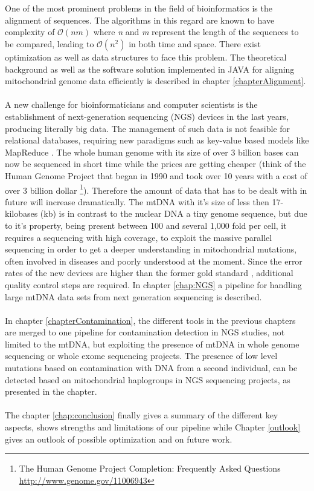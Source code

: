 \\
\\
One of the most prominent problems in the field of bioinformatics is the alignment of sequences. The algorithms in this regard are known to have complexity of $\mathcal O(nm)$ where \textit{n} and \textit{m} represent the length of the sequences to be compared, leading to $\mathcal O(n^2)$ in both time and space. There exist optimization as well as data structures to face this problem. The theoretical background as well as the software solution implemented in JAVA for aligning mitochondrial genome data efficiently is described in chapter \ref{chapterAlignment}.
\\
\\
A new challenge for bioinformaticians and computer scientists is the establishment of next-generation sequencing (NGS) devices in the last years, producing literally big data. The management of such data is not feasible for relational databases, requiring new paradigms such as key-value based models like MapReduce \cite{Dean2008}. The whole human genome with its size of over 3 billion bases can now be sequenced in short time while the prices are getting cheaper (think of the Human Genome Project that began in 1990 and took over 10 years with a cost of over 3 billion dollar \footnote{The Human Genome Project Completion: Frequently Asked Questions \url{http://www.genome.gov/11006943}}). Therefore the amount of data that has to be dealt with in future will increase dramatically. The mtDNA with it's size of less then 17-kilobases (kb) is in contrast to the nuclear DNA a tiny genome sequence, but due to it's property, being present between 100 and several 1,000 fold per cell, it requires a sequencing with high coverage, to exploit the massive parallel sequencing in order to get a deeper understanding in mitochondrial mutations, often involved in diseases and poorly understood at the moment. Since the error rates of the new devices are higher than the former gold standard \cite{Wang2011}, additional quality control steps are required. In chapter \ref{chap:NGS} a pipeline for handling large mtDNA data sets from next generation sequencing is described.
\\
\\
In chapter \ref{chapterContamination}, the different tools in the previous chapters are merged to one pipeline for contamination detection in NGS studies, not limited to the mtDNA, but exploiting the presence of mtDNA in whole genome sequencing or whole exome sequencing projects. The presence of low level mutations based on contamination with DNA from a second individual, can be detected based on mitochondrial haplogroups in NGS sequencing projects, as presented in the chapter.
\\
\\
The chapter \ref{chap:conclusion} finally gives a summary of the different key aspects, shows strengths and limitations of our pipeline while Chapter \ref{outlook} gives an outlook of possible optimization and on future work.



